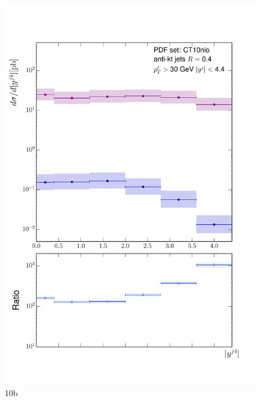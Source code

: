 	\begin{figure}[h]
		\centering
		\includegraphics[width=0.8\linewidth]{Figures/ATLAS_Z_100TeV_10b.pdf}
		\caption{10b}
		\label{fig:emissionsites}
	\end{figure}

